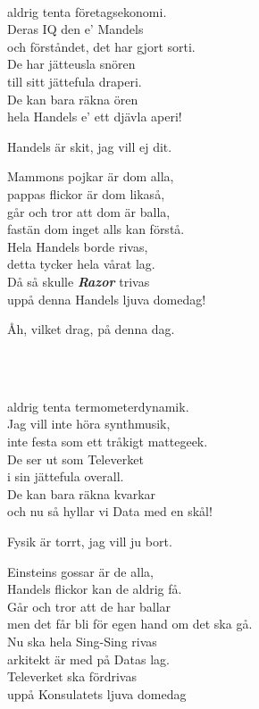 \\
aldrig tenta företagsekonomi.\\
Deras IQ den e' Mandels\\
och förståndet, det har gjort sorti.\\
De har jätteusla snören\\
till sitt jättefula draperi.\\
De kan bara räkna ören\\
hela Handels e' ett djävla aperi!

\leftrepeat Handels är skit, jag vill ej dit. \rightrepeat

Mammons pojkar är dom alla,\\
pappas flickor är dom likaså,\\
går och tror att dom är balla,\\
fastän dom inget alls kan förstå.\\
Hela Handels borde rivas,\\
detta tycker hela vårat lag.\\
Då så skulle \textbf{\textit{Razor}} trivas\\
uppå denna Handels ljuva domedag!

\leftrepeat Åh, vilket drag, på denna dag. \rightrepeat


\newpage
 \\       

\\
aldrig tenta termometerdynamik.\\
Jag vill inte höra synthmusik,\\
inte festa som ett tråkigt mattegeek.\\ %
De ser ut som Televerket\\
i sin jättefula overall.\\
De kan bara räkna kvarkar\\
och nu så hyllar vi Data med en skål!

\leftrepeat Fysik är torrt, jag vill ju bort. \rightrepeat

Einsteins gossar är de alla,\\
Handels flickor kan de aldrig få.\\
Går och tror att de har ballar\\
men det får bli för egen hand om det ska gå.\\
Nu ska hela Sing-Sing rivas\\
arkitekt är med på Datas lag.\\
Televerket ska fördrivas\\
uppå Konsulatets ljuva domedag

